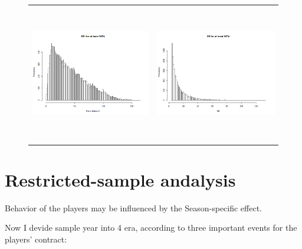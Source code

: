 \documentclass[dvipdfmx]{article}
\begin{document}
\begin{itemize}
\begin{figure}[H]
\begin{tabular}{cc}
    \includegraphics[width = 8cm, height = 6cm]{graphs/RBI_90PA.png} &
    \includegraphics[width = 8cm, height = 6cm]{graphs/SB_5SB.png} \\
   \end{tabular}
 \end{figure}



  \begin{landscape}
   
  \end{landscape}


   \begin{landscape}
     

     
   \end{landscape}

  \end{itemize}

 \section{Restricted-sample andalysis}

 Behavior of the players may be influenced by the Season-specific effect.

 Now I devide sample year into 4 era, according to three important
 events for the players' contract:
\end{document}
